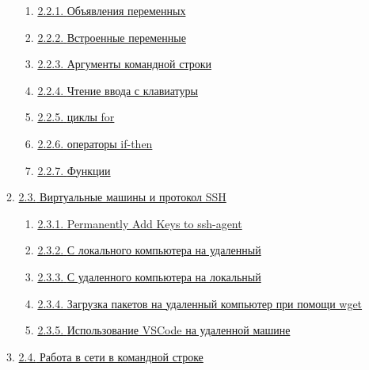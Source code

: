 \documentclass{report}
\begin{document}
\begin{enumerate}
\begin{enumerate}
    \begin{enumerate}
    \tightlist
    \item
      \protect\hyperlink{Variable-declarations}{{2.2.1.} {Объявления
      переменных}}
    \item
      \protect\hyperlink{Built-In-Variables}{{2.2.2.} {Встроенные
      переменные}}
    \item
      \protect\hyperlink{Command-Line-Arguments}{{2.2.3.} {Аргументы
      командной строки}}
    \item
      \protect\hyperlink{Reading-user-input}{{2.2.4.} {Чтение ввода с
      клавиатуры}}
    \item
      \protect\hyperlink{for-loops}{{2.2.5.} {циклы for}}
    \item
      \protect\hyperlink{if-then-statements}{{2.2.6.} {операторы
      if-then}}
    \item
      \protect\hyperlink{Functions}{{2.2.7.} {Функции}}
    \end{enumerate}
  \item
    \protect\hyperlink{Virtual-Machines-and-SSH-Protocol}{{2.3.}
    {Виртуальные машины и протокол SSH}}

    \begin{enumerate}
    \tightlist
    \item
      \protect\hyperlink{Permanently-Add-Keys-to-ssh-agent}{{2.3.1.}
      {Permanently Add Keys to ssh-agent}}
    \item
      \protect\hyperlink{From-local-computer-to-remote-machine}{{2.3.2.}
      {С локального компьютера на удаленный}}
    \item
      \protect\hyperlink{From-remote-machine-to-local-computer}{{2.3.3.}
      {С удаленного компьютера на локальный}}
    \item
      \protect\hyperlink{Downloading-packages-to-your-remote-machine-with-wget}{{2.3.4.}
      {Загрузка пакетов на удаленный компьютер при помощи wget}}
    \item
      \protect\hyperlink{Using-VSCode-with-your-remote-machine}{{2.3.5.}
      {Использование VSCode на удаленной машине}}
    \end{enumerate}
  \item
    \protect\hyperlink{Networking-on-Command-Line}{{2.4.} {Работа в сети
    в командной строке}}


\end{enumerate}
\end{enumerate}
\end{document}
